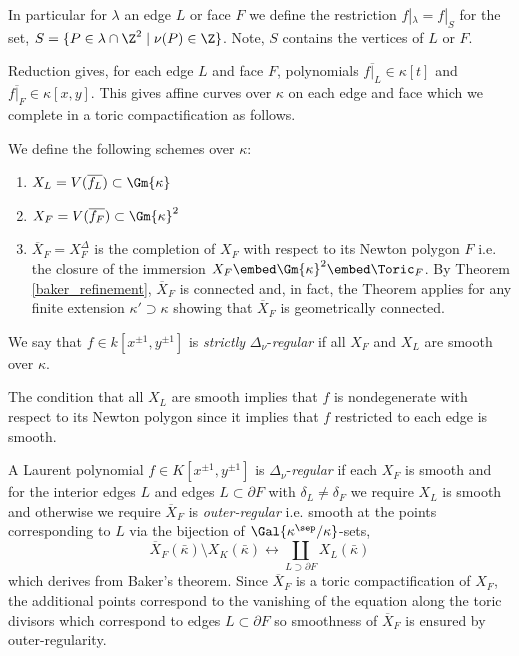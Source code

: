 \begin{defn}
In particular for $\lambda$ an edge $L$ or face $F$ we define the restriction $f |_\lambda = f|_S$ for the set, $S = \{ P \in \lambda \cap \Z^2 \mid \nu(P) \in \Z \}$. Note, $S$ contains the vertices of $L$ or $F$.  
\end{defn}

\begin{rmk}
Reduction gives, for each edge $L$ and face $F$, polynomials $\overline{f|_L} \in \kappa[t]$ and $\overline{f|_F} \in \kappa[x, y]$. This gives affine curves over $\kappa$ on each edge and face which we complete in a toric compactification as follows.
\end{rmk}

\begin{defn}[Components]
We define the following schemes over $\kappa$:
\begin{enumerate}
\item $X_L = V(\overline{f_L}) \subset \Gm{\kappa}$ 
\item $X_F = V(\overline{f_F}) \subset \Gm{\kappa}^2$
\item $\overline{X}_F = X_F^\Delta$ is the completion of $X_F$ with respect to its Newton polygon $F$ i.e. the closure of the immersion $X_F \embed \Gm{\kappa}^2 \embed \Toric_F$. By Theorem \ref{baker_refinement}, $\overline{X}_F$ is connected and, in fact, the Theorem applies for any finite extension $\kappa' \supset \kappa$ showing that $\overline{X}_F$ is geometrically connected.
\end{enumerate}
\end{defn}

\begin{defn}
We say that $f \in k[x^{\pm 1}, y^{\pm 1}]$ is \textit{strictly} $\Delta_\nu$-\textit{regular} if all $X_F$ and $X_L$ are smooth over $\kappa$. 
\end{defn}

\begin{rmk}
The condition that all $X_L$ are smooth implies that $f$ is nondegenerate with respect to its Newton polygon since it implies that $f$ restricted to each edge is smooth. 
\end{rmk}

\begin{defn}
A Laurent polynomial $f \in K[x^{\pm 1}, y^{\pm 1}]$ is $\Delta_\nu$-\textit{regular} if each $X_F$ is smooth and for the interior edges $L$ and edges $L \subset \partial F$ with $\delta_L \neq \delta_F$ we require $X_L$ is smooth and otherwise we require $\overline{X}_F$ is \textit{outer-regular} i.e. smooth at the points corresponding to $L$ via the bijection of $\Gal{\kappa^\sep / \kappa}$-sets,
\[ \overline{X}_F(\bar{\kappa}) \setminus X_K(\bar{\kappa}) \longleftrightarrow \coprod_{L \supset \partial F} X_L(\bar{\kappa}) \]
which derives from Baker's theorem. Since $\overline{X}_F$ is a toric compactification of $X_F$, the additional points correspond to the vanishing of the equation along the toric divisors which correspond to edges $L \subset \partial F$ so smoothness of $\overline{X}_F$ is ensured by outer-regularity.
\end{defn}

